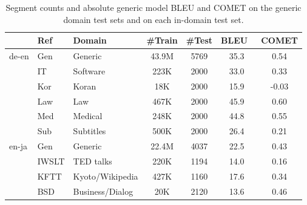 \documentclass[11pt]{article}
\begin{document}
\begin{table*}
    \centering
    \small
    \begin{tabular}{p{0.7cm}|ll|cccc}
& Ref & Domain  &  \#Train  &\#Test & BLEU\ & COMET\\
\hline
 \multirow{6}{*}{de-en}  & Gen & Generic& 43.9M &5769 & 35.3 & 0.54\\ 
 \cline{2-7}
 & IT & Software & 223K &2000 & 33.0 & 0.33\\
   &     Kor & Koran& 18K  &2000 & 15.9 & -0.03\\
    &    Law & Law & 467K  &2000 & 45.9 & 0.60\\
     &   Med &  Medical & 248K &2000 & 44.8 & 0.55\\
     &   Sub & Subtitles & 500K  &2000 & 26.4 & 0.21\\

\hline
 \multirow{4}{*}{en-ja}  & Gen   &Generic & 22.4M & 4037& 22.5 & 0.43\\
  \cline{2-7}
 & IWSLT  & TED talks & 220K& 1194  & 14.0 & 0.16 \\
    &  KFTT   & Kyoto/Wikipedia & 427K  & 1160 &17.6 & 0.34\\
& BSD & Business/Dialog & 20K & 2120 & 13.6 & 0.46\\     
    \end{tabular}
    \caption{Segment counts and absolute generic model BLEU and COMET on the generic domain test sets and on each in-domain test set. %
    }
    \label{tab:datasets}
\end{table*}
\end{document}
